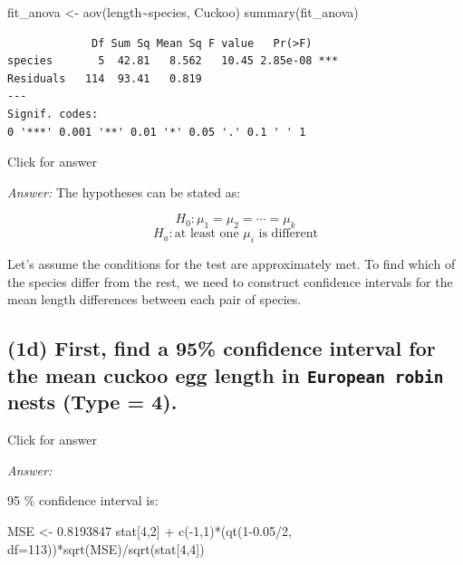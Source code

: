 \documentclass[
]{book}
\newenvironment{Shaded}{\begin{snugshade}}{\end{snugshade}}
\newcommand{\AttributeTok}[1]{\textcolor[rgb]{0.77,0.63,0.00}{#1}}
\newcommand{\DecValTok}[1]{\textcolor[rgb]{0.00,0.00,0.81}{#1}}
\newcommand{\FloatTok}[1]{\textcolor[rgb]{0.00,0.00,0.81}{#1}}
\newcommand{\FunctionTok}[1]{\textcolor[rgb]{0.00,0.00,0.00}{#1}}
\newcommand{\NormalTok}[1]{#1}
\newcommand{\OtherTok}[1]{\textcolor[rgb]{0.56,0.35,0.01}{#1}}
\newcommand{\SpecialCharTok}[1]{\textcolor[rgb]{0.00,0.00,0.00}{#1}}
\begin{document}
\begin{Shaded}
\begin{Highlighting}[]
\NormalTok{fit\_anova }\OtherTok{\textless{}{-}} \FunctionTok{aov}\NormalTok{(length}\SpecialCharTok{\textasciitilde{}}\NormalTok{species, Cuckoo)}
\FunctionTok{summary}\NormalTok{(fit\_anova)}
\end{Highlighting}
\end{Shaded}

\begin{verbatim}
             Df Sum Sq Mean Sq F value   Pr(>F)    
species       5  42.81   8.562   10.45 2.85e-08 ***
Residuals   114  93.41   0.819                     
---
Signif. codes:  
0 '***' 0.001 '**' 0.01 '*' 0.05 '.' 0.1 ' ' 1
\end{verbatim}

Click for answer

\emph{Answer:} The hypotheses can be stated as:

\[H_0:\mu_1 = \mu_2 = \cdots = \mu_k\]
\[H_a: \text{at least one } \mu_i \text{ is different}\]

Let's assume the conditions for the test are approximately met. To find which of the species differ from the rest, we need to construct confidence intervals for the mean length differences between each pair of species.

\hypertarget{d-first-find-a-95-confidence-interval-for-the-mean-cuckoo-egg-length-in-european-robin-nests-type-4.}{%
\subsection{\texorpdfstring{(1d) First, find a 95\% confidence interval for the mean cuckoo egg length in \texttt{European\ robin} nests (Type = 4).}{(1d) First, find a 95\% confidence interval for the mean cuckoo egg length in European robin nests (Type = 4).}}\label{d-first-find-a-95-confidence-interval-for-the-mean-cuckoo-egg-length-in-european-robin-nests-type-4.}}

Click for answer

\emph{Answer:}

95 \(\%\) confidence interval is:

\begin{Shaded}
\begin{Highlighting}[]
\NormalTok{MSE }\OtherTok{\textless{}{-}} \FloatTok{0.8193847}
\NormalTok{stat[}\DecValTok{4}\NormalTok{,}\DecValTok{2}\NormalTok{] }\SpecialCharTok{+} \FunctionTok{c}\NormalTok{(}\SpecialCharTok{{-}}\DecValTok{1}\NormalTok{,}\DecValTok{1}\NormalTok{)}\SpecialCharTok{*}\NormalTok{(}\FunctionTok{qt}\NormalTok{(}\DecValTok{1}\FloatTok{{-}0.05}\SpecialCharTok{/}\DecValTok{2}\NormalTok{, }\AttributeTok{df=}\DecValTok{113}\NormalTok{))}\SpecialCharTok{*}\FunctionTok{sqrt}\NormalTok{(MSE)}\SpecialCharTok{/}\FunctionTok{sqrt}\NormalTok{(stat[}\DecValTok{4}\NormalTok{,}\DecValTok{4}\NormalTok{])}
\end{Highlighting}
\end{Shaded}
\end{document}
